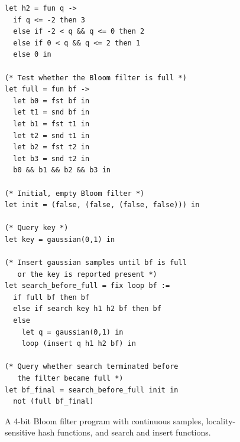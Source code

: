 \begin{figure}[t]
\begin{minipage}[t]{0.46\textwidth}
\begin{lstlisting}
let h2 = fun q ->
  if q <= -2 then 3
  else if -2 < q && q <= 0 then 2
  else if 0 < q && q <= 2 then 1
  else 0 in

(* Test whether the Bloom filter is full *)
let full = fun bf ->
  let b0 = fst bf in
  let t1 = snd bf in
  let b1 = fst t1 in
  let t2 = snd t1 in
  let b2 = fst t2 in
  let b3 = snd t2 in
  b0 && b1 && b2 && b3 in

(* Initial, empty Bloom filter *)
let init = (false, (false, (false, false))) in

(* Query key *)
let key = gaussian(0,1) in

(* Insert gaussian samples until bf is full
   or the key is reported present *)
let search_before_full = fix loop bf :=
  if full bf then bf
  else if search key h1 h2 bf then bf
  else
    let q = gaussian(0,1) in
    loop (insert q h1 h2 bf) in

(* Query whether search terminated before
   the filter became full *)
let bf_final = search_before_full init in
  not (full bf_final)
    \end{lstlisting}
    \end{minipage}%
    \hspace{4pt}
    
    \caption{A 4-bit Bloom filter program with continuous samples, locality-sensitive hash functions, and search and insert functions.}
    \label{fig:app:bloom-filter}
\end{figure}

